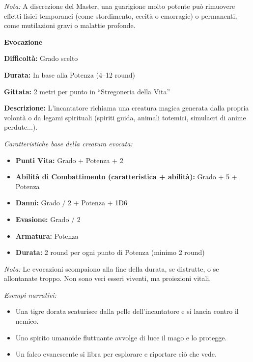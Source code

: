 \documentclass[./magie.tex]{subfiles}
\begin{document}
\textit{Nota:} A discrezione del Master, una guarigione molto potente può rimuovere effetti fisici temporanei (come stordimento, cecità o emorragie) o permanenti, come mutilazioni gravi o malattie profonde.

\clearpage
{\zarafirtitlefont\Large\bfseries\noindent Evocazione}\\
\begin{description}
\item \textbf{Difficoltà:} Grado scelto
\item \textbf{Durata:} In base alla Potenza (4–12 round)
\item \textbf{Gittata:} 2 metri per punto in “Stregoneria della Vita”
\item \textbf{Descrizione:} L’incantatore richiama una creatura magica generata dalla propria volontà o da legami spirituali (spiriti guida, animali totemici, simulacri di anime perdute...).
\end{description}

\textit{Caratteristiche base della creatura evocata:}
\begin{itemize}
\item \textbf{Punti Vita:} Grado + Potenza + 2
\item \textbf{Abilità di Combattimento (caratteristica + abilità):} Grado + 5 + Potenza
\item \textbf{Danni:} Grado / 2 + Potenza + 1D6
\item \textbf{Evasione:} Grado / 2
\item \textbf{Armatura:} Potenza
\item \textbf{Durata:} 2 round per ogni punto di Potenza (minimo 2 round)
\end{itemize}

\textit{Nota:} Le evocazioni scompaiono alla fine della durata, se distrutte, o se allontanate troppo. Non sono veri esseri viventi, ma proiezioni vitali.

\textit{Esempi narrativi:}
\begin{itemize}
\item Una tigre dorata scaturisce dalla pelle dell’incantatore e si lancia contro il nemico.
\item Uno spirito umanoide fluttuante avvolge di luce il mago e lo protegge.
\item Un falco evanescente si libra per esplorare e riportare ciò che vede.
\end{itemize}
\end{document}
